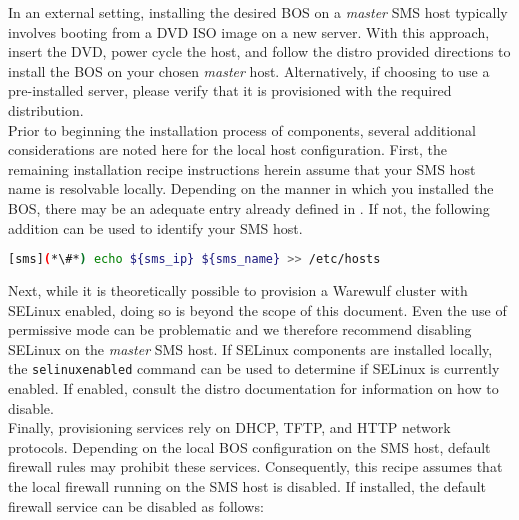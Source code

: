 In an external setting, installing the desired BOS on a
{\em master} SMS host typically involves booting from a DVD ISO image on a new
server. With this approach, insert the \baseOS{} DVD, power cycle the host, and
follow the distro provided directions to install the BOS on your chosen {\em
master} host.  Alternatively, if choosing to use a pre-installed server, please
verify that it is provisioned with the required \baseOS{} distribution. \\

Prior to beginning the installation process of \OHPC{} components, several additional
considerations are noted here for the local host configuration. First, 
the remaining installation recipe instructions herein assume that
your SMS host name is resolvable locally. Depending on the manner in which you
installed the BOS, there may be an adequate entry already defined
in . If not, the following addition can be used to identify
your SMS host.
\begin{lstlisting}[language=bash]
[sms](*\#*) echo ${sms_ip} ${sms_name} >> /etc/hosts
\end{lstlisting}

Next, while it is theoretically possible to provision a Warewulf cluster with SELinux
enabled, doing so is beyond the scope of this document. Even the use of
permissive mode can be problematic and we therefore recommend disabling SELinux on the {\em
master} SMS host. If SELinux components are installed locally,
the \texttt{selinuxenabled} command can be used to determine if SELinux is
currently enabled. If enabled, consult the distro documentation for information
on how to disable. \\

Finally, provisioning services rely on DHCP, TFTP, and HTTP network protocols.
Depending on the local BOS configuration on the SMS host, default firewall
rules may prohibit these services. Consequently, this recipe assumes that the local
firewall running on the SMS host is disabled. If installed, the default
firewall service can be disabled as follows:
